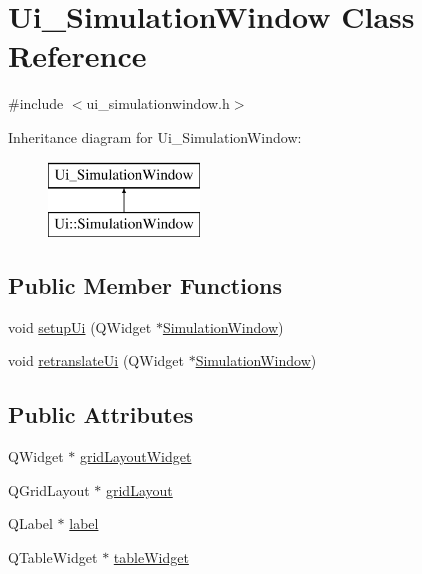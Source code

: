 \hypertarget{class_ui___simulation_window}{}\section{Ui\+\_\+\+Simulation\+Window Class Reference}
\label{class_ui___simulation_window}


{\ttfamily \#include $<$ui\+\_\+simulationwindow.\+h$>$}

Inheritance diagram for Ui\+\_\+\+Simulation\+Window\+:\begin{figure}[H]
\begin{center}
\leavevmode
\includegraphics[height=2.000000cm]{class_ui___simulation_window}
\end{center}
\end{figure}
\subsection*{Public Member Functions}
\begin{DoxyCompactItemize}
\item 
void \mbox{\hyperlink{class_ui___simulation_window_ae9e8fd0e316c3596f4adaaf6b48760bb}{setup\+Ui}} (Q\+Widget $\ast$\mbox{\hyperlink{class_simulation_window}{Simulation\+Window}})
\item 
void \mbox{\hyperlink{class_ui___simulation_window_a5d1a36396edce9196943ec57bc042792}{retranslate\+Ui}} (Q\+Widget $\ast$\mbox{\hyperlink{class_simulation_window}{Simulation\+Window}})
\end{DoxyCompactItemize}
\subsection*{Public Attributes}
\begin{DoxyCompactItemize}
\item 
Q\+Widget $\ast$ \mbox{\hyperlink{class_ui___simulation_window_a7c98b355d26239d3f1b80930907b8558}{grid\+Layout\+Widget}}
\item 
Q\+Grid\+Layout $\ast$ \mbox{\hyperlink{class_ui___simulation_window_aa179c5b2243beae31a8a27244cef9b49}{grid\+Layout}}
\item 
Q\+Label $\ast$ \mbox{\hyperlink{class_ui___simulation_window_a018a909788690a5f85fea51b8c634df4}{label}}
\item 
Q\+Table\+Widget $\ast$ \mbox{\hyperlink{class_ui___simulation_window_a1e2e6c18ead217454c4f749bdf44b9cd}{table\+Widget}}
\end{DoxyCompactItemize}


